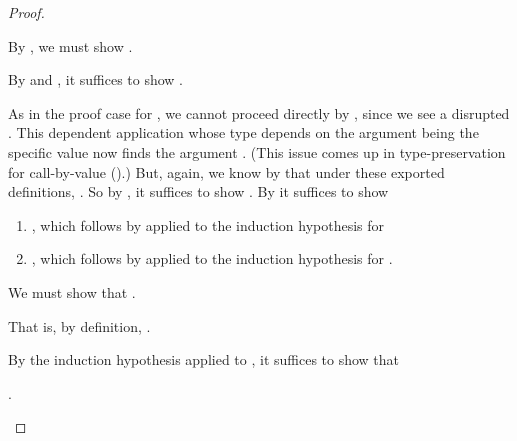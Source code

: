 {\begin{proof}
\begin{proofcases}
      By , we must show
      \im{\styjudg{\tlenvpr}{\tappe{\txone}{\txtwo}}{\anfh{\subst{\sBpr}{\setwo}{\sx}}}}.

      By  and , it suffices to show
      \im{\styjudg{\tlenvpr}{\tappe{\txone}{\txtwo}}{\subst{\anfh{\sBpr}}{\anfh{\setwo}}{\sx}}}.

      As in the proof case for , we cannot proceed directly by
      , since we see a disrupted .
      This dependent application whose type depends on the argument being the
      specific value \im{\anfh{\setwo}} now finds the argument \im{\txtwo}.
      (This issue comes up in type-preservation for call-by-value 
      ().)
      But, again, we know by  that under these
      exported definitions, \im{\anfh{\setwo} \equiv \txtwo}.
      So by , it suffices to show \im{\styjudg{\tlenvpr}{\tappe{\txone}{\txtwo}}{\subst{\anfh{\sBpr}}{\txtwo}{\sx}}}.
      By  it suffices to show
      \begin{enumerate}[leftmargin=*]
      \item
        \im{\styjudg{\tlenvpr}{\txone}{\tpity{\tx}{\anfh{\sApr}}{\anfh{\sBpr}}}},
        which follows by  applied to the induction
        hypothesis for \im{\styjudg{\slenv}{\seone}{\spity{\sx}{\sApr}{\sBpr}}}
      \item \im{\styjudg{\tlenvpr}{\txtwo}{\anfh{\sApr}}},
        which follows by  applied to the induction
        hypothesis for \im{\styjudg{\slenv}{\setwo}{\sApr}}.
      \end{enumerate}

    \item {}

      We must show that \im{\styjudg{\anfh{\slenv}}{\anf{\slete{\sx}{\seone}{\setwo}}{\tK}}{\tB}}.

      That is, by definition, \im{\styjudg{\anfh{\slenv}}{\anf{\seone}{\tlete{\txone}{\hole}{\anf{\setwo}{\tK}}}}{\tB}}.

      By the induction hypothesis applied to \im{\styjudg{\slenv}{\seone}{\sA}}, it suffices to show that

      \im{\styjudg{\anfh{\slenv},\edefs{\seone}}{\tlete{\txone}{\hole}{\anf{\setwo}{\tK}}}{(\ehole{\seone} : \anfh{\sA}) \Rightarrow \tB}}.


\end{proofcases}
\end{proof}}
